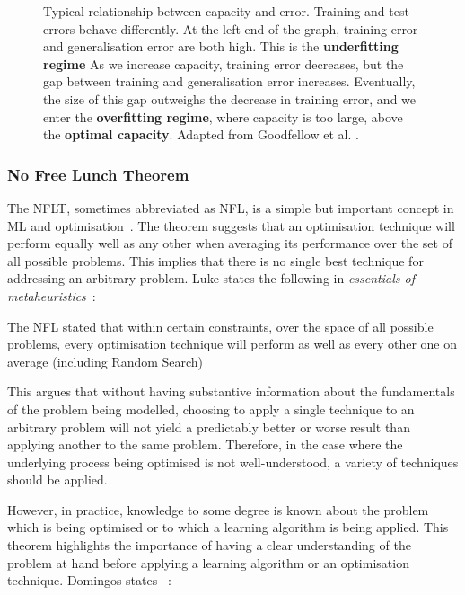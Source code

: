 \begin{figure}[htp]
    \centering
    
    \captionsetup{format=hang} %
    \caption{
        Typical relationship between capacity and error. Training and test errors behave differently. At the left end of the graph, training error and generalisation error are both high. This is the \textbf{underfitting regime} As we increase capacity, training error decreases, but the gap between training and generalisation error increases. Eventually, the size of this gap outweighs the decrease in training error, and we enter the \textbf{overfitting regime}, where capacity is too large, above the \textbf{optimal capacity}. Adapted from Goodfellow et al. \cite{Goodfellow-et-al-2016}.
    }
    \label{fig:capacity}
\end{figure}

\subsubsection{No Free Lunch Theorem}

The \gls{NFLT}, sometimes abbreviated as \gls{NFL}, is a simple but important
concept in \gls{ML} and optimisation~\cite{Wolpert1997}. The theorem suggests
that an optimisation technique will perform equally well as any other when
averaging its performance over the set of all possible problems. This implies
that there is no single best technique for addressing an arbitrary problem. Luke
states the following in \textit{essentials of
metaheuristics}~\cite{luke2012essentials}:

\begin{fancyquotes}
    The \gls{NFL} stated that within certain constraints, over the space of
    all possible problems, every optimisation technique will perform as well as
    every other one on average (including Random Search)
\end{fancyquotes}

This argues that without having substantive information about the fundamentals of the problem being modelled, choosing to apply a single technique to an arbitrary problem will not yield a predictably better or worse result than applying another to the same problem. Therefore, in the case where the underlying process being optimised is not well-understood, a variety of techniques should be applied.

However, in practice, knowledge to some degree is known about the problem which
is being optimised or to which a learning algorithm is being applied. This
theorem highlights the importance of having a clear understanding of the problem
at hand before applying a learning algorithm or an optimisation technique.
Domingos states ~\cite{Domingos15}:

